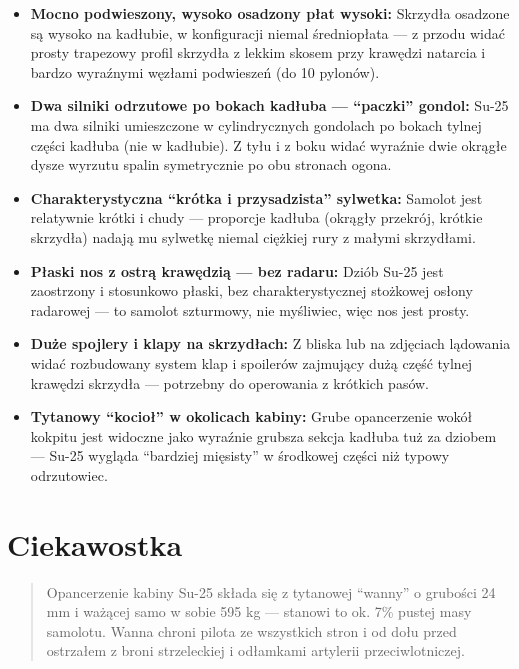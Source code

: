 \documentclass[12pt,openany,oneside]{book}
\providecommand{\tightlist}{%
  \setlength{\itemsep}{0pt}\setlength{\parskip}{0pt}}
\begin{document}
\begin{itemize}
\tightlist
\item
  \textbf{Mocno podwieszony, wysoko osadzony płat wysoki:} Skrzydła
  osadzone są wysoko na kadłubie, w konfiguracji niemal średniopłata ---
  z przodu widać prosty trapezowy profil skrzydła z lekkim skosem przy
  krawędzi natarcia i bardzo wyraźnymi węzłami podwieszeń (do 10
  pylonów).
\item
  \textbf{Dwa silniki odrzutowe po bokach kadłuba --- ``paczki''
  gondol:} Su-25 ma dwa silniki umieszczone w cylindrycznych gondolach
  po bokach tylnej części kadłuba (nie w kadłubie). Z tyłu i z boku
  widać wyraźnie dwie okrągłe dysze wyrzutu spalin symetrycznie po obu
  stronach ogona.
\item
  \textbf{Charakterystyczna ``krótka i przysadzista'' sylwetka:} Samolot
  jest relatywnie krótki i chudy --- proporcje kadłuba (okrągły
  przekrój, krótkie skrzydła) nadają mu sylwetkę niemal ciężkiej rury z
  małymi skrzydłami.
\item
  \textbf{Płaski nos z ostrą krawędzią --- bez radaru:} Dziób Su-25 jest
  zaostrzony i stosunkowo płaski, bez charakterystycznej stożkowej
  osłony radarowej --- to samolot szturmowy, nie myśliwiec, więc nos
  jest prosty.
\item
  \textbf{Duże spojlery i klapy na skrzydłach:} Z bliska lub na
  zdjęciach lądowania widać rozbudowany system klap i spoilerów
  zajmujący dużą część tylnej krawędzi skrzydła --- potrzebny do
  operowania z krótkich pasów.
\item
  \textbf{Tytanowy ``kocioł'' w okolicach kabiny:} Grube opancerzenie
  wokół kokpitu jest widoczne jako wyraźnie grubsza sekcja kadłuba tuż
  za dziobem --- Su-25 wygląda ``bardziej mięsisty'' w środkowej części
  niż typowy odrzutowiec.
\end{itemize}

\section{Ciekawostka}\label{ciekawostka-42}

\begin{quote}
Opancerzenie kabiny Su-25 składa się z tytanowej ``wanny'' o grubości 24
mm i ważącej samo w sobie 595 kg --- stanowi to ok. 7\% pustej masy
samolotu. Wanna chroni pilota ze wszystkich stron i od dołu przed
ostrzałem z broni strzeleckiej i odłamkami artylerii przeciwlotniczej.
\end{quote}
\end{document}
